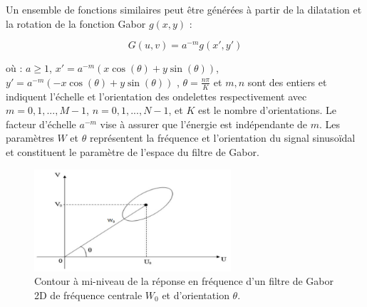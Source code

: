  Un ensemble de fonctions similaires peut être générées à partir de la dilatation et la rotation de la fonction Gabor $g(x, y)$ :
 

\begin{equation}
 	G(u, v) = a^{-m} g(x', y')
\end{equation}


 où : $a \ge 1 $, $x' = a^{-m} ( x \cos(\theta) + y \sin(\theta) )$,  $y' = a^{-m} ( -x \cos(\theta) + y \sin(\theta) )$ , $\theta = \frac{n\pi}{K}$ et $m,n$ sont des entiers et indiquent l'échelle et l’orientation des ondelettes respectivement avec $m = 0,1,..., M-1 $,  $n=0,1,..., N-1$, et $K$ est le nombre d'orientations. Le facteur d’échelle $ a^{-m} $ vise à assurer que l'énergie est indépendante de $m$. Les paramètres $W$ et $\theta$ représentent la fréquence et l'orientation du signal sinusoïdal et constituent le paramètre de l'espace du filtre de Gabor.\\

\begin{figure}[H]
	\label{fig:gaborFig}
	\centering
	\includegraphics[width=0.65\textwidth]{Figures/gaborFig} %
	
	\caption{Contour à mi-niveau de la réponse en fréquence d’un filtre de Gabor 2D de fréquence centrale $W_0$ et d’orientation $\theta$.}
\end{figure}

